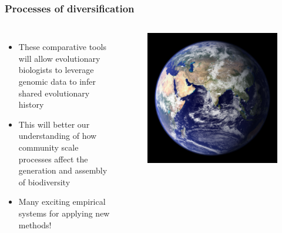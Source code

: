 {
\begin{frame}
    \frametitle{Processes of diversification}
    \begin{columns}[c]
        {
        \begin{itemize}
            \item<1-> These comparative tools will allow evolutionary
                biologists to leverage genomic data to infer shared
                evolutionary history
            \item<2-> This will better our understanding of how community scale
                processes affect the generation and assembly of biodiversity
            \item<3-> Many exciting empirical systems for applying new methods!
        \end{itemize}
        }
        \begin{figure}
            \begin{center}
            \includegraphics[width=\textwidth]{../images/earth-image.jpg}
            \end{center}
        \end{figure}
    \end{columns}
\end{frame}
}


